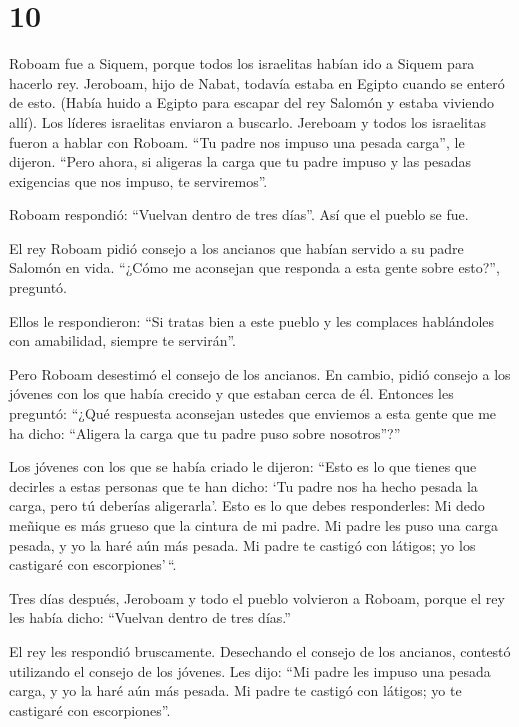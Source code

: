 \hypertarget{section-9}{%
\section{10}\label{section-9}}

 Roboam fue a Siquem, porque todos los israelitas habían ido
a Siquem para hacerlo rey.  Jeroboam, hijo de Nabat, todavía
estaba en Egipto cuando se enteró de esto. (Había huido a Egipto para
escapar del rey Salomón y estaba viviendo allí).  Los
líderes israelitas enviaron a buscarlo. Jereboam y todos los israelitas
fueron a hablar con Roboam.  ``Tu padre nos impuso una
pesada carga'', le dijeron. ``Pero ahora, si aligeras la carga que tu
padre impuso y las pesadas exigencias que nos impuso, te serviremos''.

 Roboam respondió: ``Vuelvan dentro de tres días''. Así que
el pueblo se fue.

 El rey Roboam pidió consejo a los ancianos que habían
servido a su padre Salomón en vida. ``¿Cómo me aconsejan que responda a
esta gente sobre esto?'', preguntó.

 Ellos le respondieron: ``Si tratas bien a este pueblo y les
complaces hablándoles con amabilidad, siempre te servirán''.

 Pero Roboam desestimó el consejo de los ancianos. En
cambio, pidió consejo a los jóvenes con los que había crecido y que
estaban cerca de él.  Entonces les preguntó: ``¿Qué
respuesta aconsejan ustedes que enviemos a esta gente que me ha dicho:
``Aligera la carga que tu padre puso sobre nosotros''?''

 Los jóvenes con los que se había criado le dijeron: ``Esto
es lo que tienes que decirles a estas personas que te han dicho: `Tu
padre nos ha hecho pesada la carga, pero tú deberías aligerarla'. Esto
es lo que debes responderles: Mi dedo meñique es más grueso que la
cintura de mi padre.  Mi padre les puso una carga pesada, y
yo la haré aún más pesada. Mi padre te castigó con látigos; yo los
castigaré con escorpiones'\,``.

 Tres días después, Jeroboam y todo el pueblo volvieron a
Roboam, porque el rey les había dicho: ``Vuelvan dentro de tres días.''

 El rey les respondió bruscamente. Desechando el consejo de
los ancianos,  contestó utilizando el consejo de los
jóvenes. Les dijo: ``Mi padre les impuso una pesada carga, y yo la haré
aún más pesada. Mi padre te castigó con látigos; yo te castigaré con
escorpiones''.

